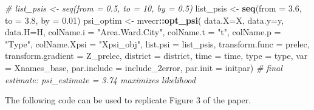 \documentclass[
]{article}
\newenvironment{Shaded}{\begin{snugshade}}{\end{snugshade}}
\newcommand{\CommentTok}[1]{\textcolor[rgb]{0.56,0.35,0.01}{\textit{#1}}}
\newcommand{\DataTypeTok}[1]{\textcolor[rgb]{0.13,0.29,0.53}{#1}}
\newcommand{\FloatTok}[1]{\textcolor[rgb]{0.00,0.00,0.81}{#1}}
\newcommand{\KeywordTok}[1]{\textcolor[rgb]{0.13,0.29,0.53}{\textbf{#1}}}
\newcommand{\NormalTok}[1]{#1}
\newcommand{\OperatorTok}[1]{\textcolor[rgb]{0.81,0.36,0.00}{\textbf{#1}}}
\newcommand{\StringTok}[1]{\textcolor[rgb]{0.31,0.60,0.02}{#1}}
\begin{document}
\begin{Shaded}
\begin{Highlighting}[]
\CommentTok{# list_psis <- seq(from = 0.5, to = 10, by = 0.5)}
\NormalTok{list_psis <-}\StringTok{ }\KeywordTok{seq}\NormalTok{(}\DataTypeTok{from =} \FloatTok{3.6}\NormalTok{, }\DataTypeTok{to =} \FloatTok{3.8}\NormalTok{, }\DataTypeTok{by =} \FloatTok{0.01}\NormalTok{)}
\NormalTok{psi_optim <-}\StringTok{ }\NormalTok{mvecr}\OperatorTok{::}\KeywordTok{opt_psi}\NormalTok{(}
  \DataTypeTok{data.X=}\NormalTok{X, }\DataTypeTok{data.y=}\NormalTok{y, }\DataTypeTok{data.H=}\NormalTok{H,}
  \DataTypeTok{colName.i =} \StringTok{"Area.Ward.City"}\NormalTok{, }\DataTypeTok{colName.t =} \StringTok{"t"}\NormalTok{, }
  \DataTypeTok{colName.p =} \StringTok{"Type"}\NormalTok{, }\DataTypeTok{colName.Xpsi =} \StringTok{"Xpsi_obj"}\NormalTok{,                          }
  \DataTypeTok{list.psi =}\NormalTok{ list_psis, }
  \DataTypeTok{transform.func =}\NormalTok{ prelec, }\DataTypeTok{transform.gradient =}\NormalTok{ Z_prelec,}
  \DataTypeTok{district =}\NormalTok{ district, }\DataTypeTok{time =}\NormalTok{ time, }\DataTypeTok{type =}\NormalTok{ type,}
  \DataTypeTok{var =}\NormalTok{ Xnames_base,}
  \DataTypeTok{par.include =}\NormalTok{ include_2error,}
  \DataTypeTok{par.init =}\NormalTok{ initpar)}
\CommentTok{# final estimate: psi_estimate = 3.74 maximizes likelihood}
\end{Highlighting}
\end{Shaded}

The following code can be used to replicate Figure 3 of the paper.
\end{document}
